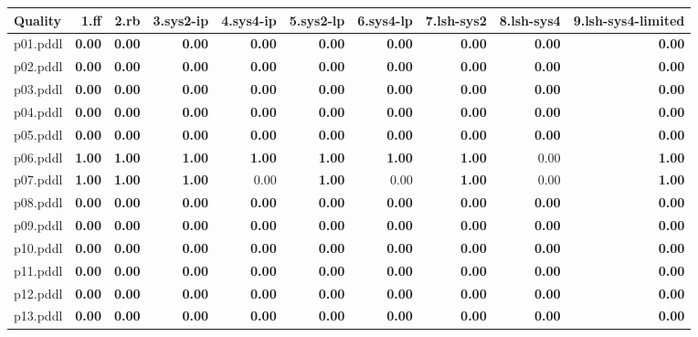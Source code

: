 \documentclass{article}
\begin{document}
\begin{tabular}{@{}lrrrrrrrrr@{}}
Quality & 1.ff & 2.rb & 3.sys2-ip & 4.sys4-ip & 5.sys2-lp & 6.sys4-lp & 7.lsh-sys2 & 8.lsh-sys4 & 9.lsh-sys4-limited \\
\midrule
p01.pddl & \textbf{0.00} & \textbf{0.00} & \textbf{0.00} & \textbf{0.00} & \textbf{0.00} & \textbf{0.00} & \textbf{0.00} & \textbf{0.00} & \textbf{0.00} \\
p02.pddl & \textbf{0.00} & \textbf{0.00} & \textbf{0.00} & \textbf{0.00} & \textbf{0.00} & \textbf{0.00} & \textbf{0.00} & \textbf{0.00} & \textbf{0.00} \\
p03.pddl & \textbf{0.00} & \textbf{0.00} & \textbf{0.00} & \textbf{0.00} & \textbf{0.00} & \textbf{0.00} & \textbf{0.00} & \textbf{0.00} & \textbf{0.00} \\
p04.pddl & \textbf{0.00} & \textbf{0.00} & \textbf{0.00} & \textbf{0.00} & \textbf{0.00} & \textbf{0.00} & \textbf{0.00} & \textbf{0.00} & \textbf{0.00} \\
p05.pddl & \textbf{0.00} & \textbf{0.00} & \textbf{0.00} & \textbf{0.00} & \textbf{0.00} & \textbf{0.00} & \textbf{0.00} & \textbf{0.00} & \textbf{0.00} \\
p06.pddl & \textbf{1.00} & \textbf{1.00} & \textbf{1.00} & \textbf{1.00} & \textbf{1.00} & \textbf{1.00} & \textbf{1.00} & 0.00 & \textbf{1.00} \\
p07.pddl & \textbf{1.00} & \textbf{1.00} & \textbf{1.00} & 0.00 & \textbf{1.00} & 0.00 & \textbf{1.00} & 0.00 & \textbf{1.00} \\
p08.pddl & \textbf{0.00} & \textbf{0.00} & \textbf{0.00} & \textbf{0.00} & \textbf{0.00} & \textbf{0.00} & \textbf{0.00} & \textbf{0.00} & \textbf{0.00} \\
p09.pddl & \textbf{0.00} & \textbf{0.00} & \textbf{0.00} & \textbf{0.00} & \textbf{0.00} & \textbf{0.00} & \textbf{0.00} & \textbf{0.00} & \textbf{0.00} \\
p10.pddl & \textbf{0.00} & \textbf{0.00} & \textbf{0.00} & \textbf{0.00} & \textbf{0.00} & \textbf{0.00} & \textbf{0.00} & \textbf{0.00} & \textbf{0.00} \\
p11.pddl & \textbf{0.00} & \textbf{0.00} & \textbf{0.00} & \textbf{0.00} & \textbf{0.00} & \textbf{0.00} & \textbf{0.00} & \textbf{0.00} & \textbf{0.00} \\
p12.pddl & \textbf{0.00} & \textbf{0.00} & \textbf{0.00} & \textbf{0.00} & \textbf{0.00} & \textbf{0.00} & \textbf{0.00} & \textbf{0.00} & \textbf{0.00} \\
p13.pddl & \textbf{0.00} & \textbf{0.00} & \textbf{0.00} & \textbf{0.00} & \textbf{0.00} & \textbf{0.00} & \textbf{0.00} & \textbf{0.00} & \textbf{0.00} \\

\end{tabular}
\end{document}
